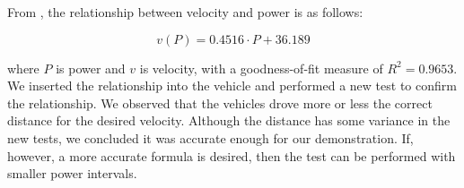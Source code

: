 From , the relationship between velocity and power is as follows: 

\begin{equation}
	v(P) = 0.4516\cdot P + 36.189\label{eq:vprelationship}
\end{equation}

where $P$ is power and $v$ is velocity, with a goodness-of-fit measure of $R^2=0.9653$.  We inserted the relationship into the vehicle and performed a new test to confirm the relationship. We observed that the vehicles drove more or less the correct distance for the desired velocity. Although the distance has some variance in the new tests, we concluded it was accurate enough for our demonstration. If, however, a more accurate formula is desired, then the test can be performed with smaller power intervals.

